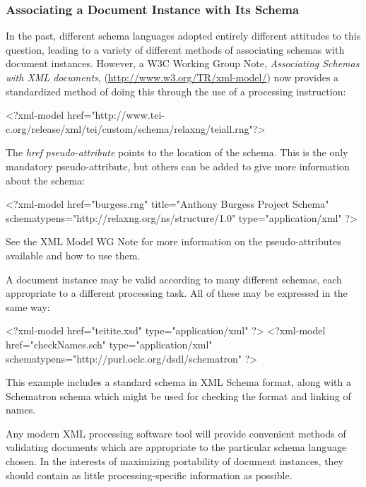 \subsubsection[{Associating a Document Instance with Its Schema}]{Associating a Document Instance with Its Schema}\label{SG-assoc}\par
In the past, different schema languages adopted entirely different attitudes to this question, leading to a variety of different methods of associating schemas with document instances. However, a W3C Working Group Note, \textit{Associating Schemas with XML documents}, (\url{http://www.w3.org/TR/xml-model/}) now provides a standardized method of doing this through the use of a processing instruction: \par\hfill\bgroup\exampleFont\vskip 10pt\begin{shaded}
\obeyspaces <?xml-model href="http://www.tei-c.org/release/xml/tei/custom/schema/relaxng/tei\textunderscore all.rng"?>\end{shaded}
\par\egroup 
 The {\itshape href} \textit{pseudo-attribute} points to the location of the schema. This is the only mandatory pseudo-attribute, but others can be added to give more information about the schema: \par\hfill\bgroup\exampleFont\vskip 10pt\begin{shaded}
\obeyspaces <?xml-model href="burgess.rng" \newline
                       title="Anthony Burgess Project Schema" \newline
                       schematypens="http://relaxng.org/ns/structure/1.0" \newline
                       type="application/xml"\newline
                     ?>\end{shaded}
\par\egroup 
 See the XML Model WG Note for more information on the pseudo-attributes available and how to use them.\par
A document instance may be valid according to many different schemas, each appropriate to a different processing task. All of these may be expressed in the same way: \par\hfill\bgroup\exampleFont\vskip 10pt\begin{shaded}
\obeyspaces <?xml-model href="tei\textunderscore tite.xsd" type="application/xml" ?>\newline
<?xml-model href="checkNames.sch" type="application/xml" schematypens="http://purl.oclc.org/dsdl/schematron" ?>\end{shaded}
\par\egroup 
 This example includes a standard schema in XML Schema format, along with a Schematron schema which might be used for checking the format and linking of names.\par
Any modern XML processing software tool will provide convenient methods of validating documents which are appropriate to the particular schema language chosen. In the interests of maximizing portability of document instances, they should contain as little processing-specific information as possible.
